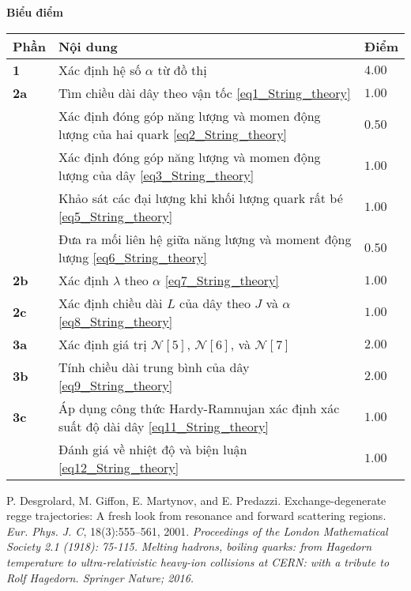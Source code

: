 \textbf{Biểu điểm}
\begin{center}
\begin{tabular}{|>{\centering\arraybackslash}m{1cm}|>{\raggedright\arraybackslash}m{14cm}| >{\centering\arraybackslash}m{1cm}|}
    \hline
    \textbf{Phần} & \textbf{Nội dung} & \textbf{Điểm} \\
    \hline
    \textbf{1} & Xác định hệ số $\alpha$ từ đồ thị & $4.00$ \\
    \hline
    \textbf{2a} & Tìm chiều dài dây theo vận tốc \eqref{eq1_String_theory} & $1.00$ \\
    \cline{2-3}
    & Xác định đóng góp năng lượng và momen động lượng của hai quark \eqref{eq2_String_theory} & $0.50$ \\
    \cline{2-3}
    & Xác định đóng góp năng lượng và momen động lượng của dây \eqref{eq3_String_theory} & $1.00$ \\
    \cline{2-3}
    & Khảo sát các đại lượng khi khối lượng quark rất bé \eqref{eq5_String_theory} & $1.00$ \\
    \cline{2-3}
    & Đưa ra mối liên hệ giữa năng lượng và moment động lượng \eqref{eq6_String_theory} & $0.50$ \\
    \hline
    \textbf{2b} & Xác định $\lambda$ theo $\alpha$ \eqref{eq7_String_theory} & $1.00$ \\
    \hline
    \textbf{2c} & Xác định chiều dài $L$ của dây theo $J$ và $\alpha$ \eqref{eq8_String_theory} & $1.00$ \\
    \hline
    \textbf{3a} & Xác định giá trị $\mathcal{N}[5]$, $\mathcal{N}[6]$, và $\mathcal{N}[7]$ & $2.00$ \\
    \hline
    \textbf{3b} & Tính chiều dài trung bình của dây \eqref{eq9_String_theory} & $2.00$ \\
    \hline
    \textbf{3c} & Áp dụng công thức Hardy-Ramnujan xác định xác suất độ dài dây \eqref{eq11_String_theory} & $1.00$ \\
    \cline{2-3}
    & Đánh giá về nhiệt độ và biện luận \eqref{eq12_String_theory} & $1.00$ \\
    \hline
\end{tabular}
\end{center}


\begin{thebibliography}{}
 P. Desgrolard, M. Giffon, E. Martynov, and E. Predazzi. Exchange-degenerate regge trajectories: A fresh look from resonance and forward scattering regions. \textit{Eur. Phys. J. C}, 18(3):555–561, 2001.
 \textit{Proceedings of the London Mathematical Society 2.1 (1918): 75-115.}
 \textit{Melting hadrons, boiling quarks: from Hagedorn temperature to ultra-relativistic heavy-ion collisions at CERN: with a tribute to Rolf Hagedorn. Springer Nature; 2016.}
\end{thebibliography}